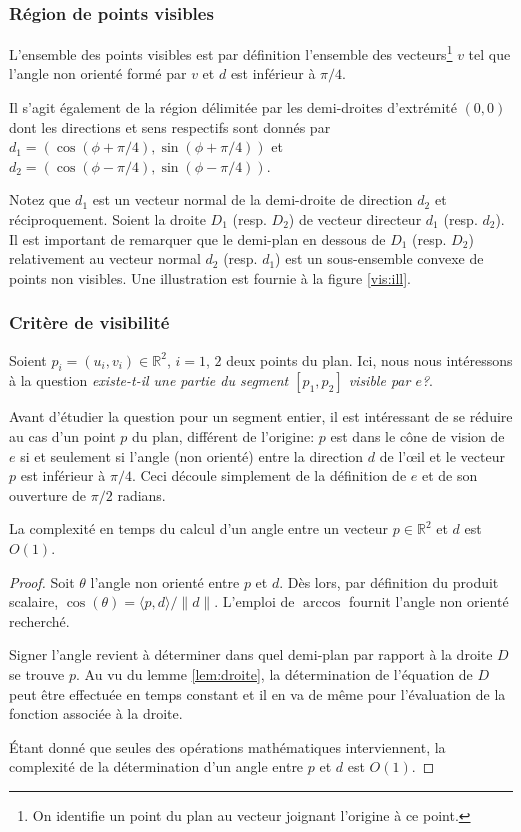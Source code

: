 \subsubsection*{Région de points visibles}
L'ensemble des points visibles est par définition l'ensemble
des vecteurs\footnote{On identifie un point du plan au vecteur
  joignant l'origine à ce point.} $v$ tel que l'angle non orienté formé
par $v$ et $d$ est inférieur à $\pi/4$.

Il s'agit également de la région délimitée par les demi-droites d'extrémité
$(0, 0)$ dont les directions et sens respectifs sont donnés par
$d_1 = (\cos(\phi + \pi/4), \sin(\phi + \pi/4))$ et
$d_2 = (\cos(\phi - \pi/4), \sin(\phi - \pi/4))$.

Notez que $d_1$ est un vecteur
normal de la demi-droite de direction $d_2$ et réciproquement.
Soient la droite $D_1$ (resp. $D_2$) de vecteur directeur $d_1$
(resp. $d_2$). Il est important de remarquer
que le demi-plan en dessous de $D_1$ (resp. $D_2$) relativement au vecteur
normal $d_2$ (resp. $d_1$) est un sous-ensemble convexe de points non visibles.
Une illustration est fournie à la figure \ref{vis:ill}.


\subsubsection*{Critère de visibilité}
Soient $p_i=(u_i, v_i)\in\mathbb R^2$, $i = 1$, $2$ deux points du plan. Ici, nous nous
intéressons à la question \og\emph{existe-t-il une partie du segment $[p_1, p_2]$
  visible par $e$?}\fg.

Avant d'étudier la question pour un segment entier, il est intéressant de
se réduire au cas d'un point $p$ du plan, différent de l'origine:
$p$ est dans le cône de vision de $e$
si et seulement si l'angle (non orienté) entre la direction
$d$ de l'\oe{}il et le vecteur $p$
est inférieur
à $\pi/4$. Ceci découle simplement de la définition de $e$ et de son ouverture
de $\pi/2$ radians.

\begin{lem}\label{lem:angle}
  La complexité en temps du calcul d'un angle entre un vecteur $p\in\mathbb R^2$
  et $d$ est $O(1)$.
\end{lem}
\begin{proof}
  Soit $\theta$ l'angle non orienté entre $p$ et $d$.
  Dès lors, par définition du produit scalaire,
  $\cos(\theta) = \langle p, d\rangle/\|d\|$. L'emploi de $\arccos$
  fournit l'angle non orienté recherché.

  Signer l'angle revient à déterminer
  dans quel demi-plan par rapport à la droite $D$ se trouve $p$.
  Au vu du lemme \ref{lem:droite}, la détermination de l'équation de $D$
  peut être effectuée en temps constant et il en va de même pour l'évaluation
  de la fonction associée à la droite.

  \'Etant donné que seules des opérations mathématiques interviennent,
  la complexité de la détermination d'un angle entre $p$ et $d$ est $O(1)$.
\end{proof}

